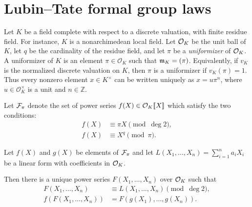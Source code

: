 \section{Lubin--Tate formal group laws}

Let $K$ be a field complete with respect to a discrete valuation, with finite
residue field. For instance, $K$ is a nonarchimedean local field. Let $\mathcal{O}_K$ be
the unit ball of $K$, let $q$ be the cardinality of the residue
field, and let $\pi$ be a \emph{uniformizer} of $\mathcal{O}_K$.
A uniformizer of $K$ is an element $\pi \in \mathcal O_K$ such that
$\mathfrak{m}_K = (\pi)$.
Equivalently, if $v_K$ is the normalized discrete valuation on $K$, then
$\pi$ is a uniformizer if $v_K(\pi)=1$.
Thus every nonzero element $x\in K^\times$ can be written uniquely as
$x = u\pi^n$, where $u\in \mathcal O_K^\times$ is a unit and $n\in \mathbb Z$.

\begin{definition}
    Let $\mathcal{F}_\pi$ denote the set of power series $f(X) \in \mathcal{O}_K[\![X]\!]$ which
    satisfy the two conditions:
    \begin{align}
        f(X) &\equiv \pi X \pmod{\deg 2}, \\
        f(X) &\equiv X ^ q \pmod{\pi}.
        \label{Lubin_Tate_condition}
    \end{align}

\end{definition}

\begin{lemma}
    Let $f(X)$ and $g(X)$ be elements of $\mathcal{F}_\pi$ and let $L(X_1, \ldots, X_n)
    = \sum_{i = 1}^n a_i X_i$ be a linear form with coefficients in $\mathcal{O}_K$.

    Then there
    is a unique power series $F(X_1, \ldots, X_n)$ over $\mathcal{O}_K$ such that
    \begin{align}
        F (X_1, \ldots, X_n) &\equiv  L(X_1, \ldots, X_n) \pmod{\deg 2}, \label{eq: LT_trunc_two} \\
        f(F(X_1, \ldots, X_n)) &= F(g(X_1), \ldots, g(X_n)). \label{eq: LT_subst}
    \end{align}
    \label{lemma: constructive_lemma_lubin_Tate}
\end{lemma}

